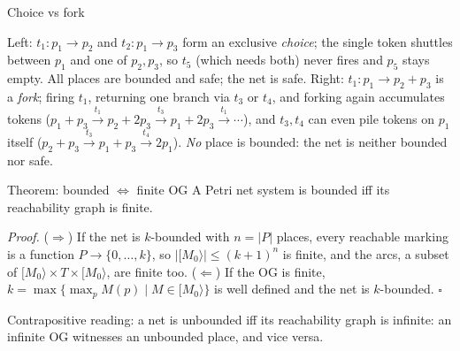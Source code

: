 \begin{examplebox}{Choice vs fork}
\begin{center}
\end{center}
Left: $t_1 : p_1 \to p_2$ and $t_2 : p_1 \to p_3$ form an exclusive \emph{choice}; the single token shuttles between $p_1$ and one of $p_2, p_3$, so $t_5$ (which needs both) never fires and $p_5$ stays empty. All places are bounded and safe; the net is safe. Right: $t_1 : p_1 \to p_2 + p_3$ is a \emph{fork}; firing $t_1$, returning one branch via $t_3$ or $t_4$, and forking again accumulates tokens ($p_1 + p_3 \xrightarrow{t_1} p_2 + 2p_3 \xrightarrow{t_3} p_1 + 2p_3 \xrightarrow{t_1} \cdots$), and $t_3, t_4$ can even pile tokens on $p_1$ itself ($p_2 + p_3 \xrightarrow{t_3} p_1 + p_3 \xrightarrow{t_4} 2p_1$). \emph{No} place is bounded: the net is neither bounded nor safe.
\end{examplebox}

\begin{definitionbox}{Theorem: bounded $\iff$ finite OG}
A Petri net system is bounded iff its reachability graph is finite.
\par\smallskip
\textit{Proof.} ($\Rightarrow$) If the net is $k$-bounded with $n = |P|$ places, every reachable marking is a function $P \to \{0, \ldots, k\}$, so $|[M_0\rangle| \leq (k+1)^n$ is finite, and the arcs, a subset of $[M_0\rangle \times T \times [M_0\rangle$, are finite too. ($\Leftarrow$) If the OG is finite, $k = \max\{\max_p M(p) \mid M \in [M_0\rangle\}$ is well defined and the net is $k$-bounded. \hfill$\square$
\end{definitionbox}

Contrapositive reading: a net is unbounded iff its reachability graph is infinite: an infinite OG witnesses an unbounded place, and vice versa.

